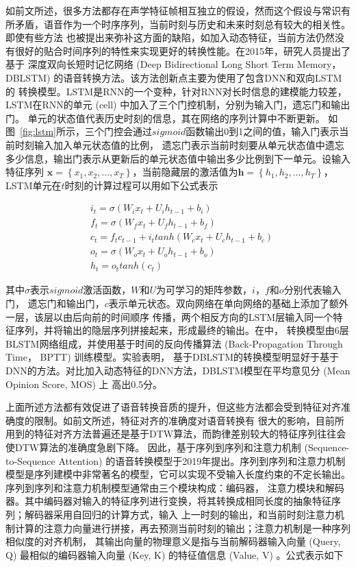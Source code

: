 如前文所述，很多方法都存在声学特征帧相互独立的假设，然而这个假设与常识有所矛盾，语音作为一个时序序列，当前时刻与历史和未来时刻总有较大的相关性。即使有些方法
也被提出来弥补这方面的缺陷，如加入动态特征，当前方法仍然没有很好的贴合时间序列的特性来实现更好的转换性能。在2015年，研究人员提出了基于
深度双向长短时记忆网络 (Deep Bidirectional Long Short Term Memory， DBLSTM) 的语音转换方法\cite{sun2015voice}。该方法创新点主要为使用了包含DNN和双向LSTM的
转换模型。LSTM是RNN的一个变种，针对RNN对长时信息的建模能力较差，LSTM在RNN的单元 (cell) 中加入了三个门控机制，分别为输入门，遗忘门和输出门。
单元的状态值代表历史时刻的信息，其在网络的序列计算中不断更新。
如图~\ref{fig:lstm}所示，三个门控会通过$sigmoid$函数输出0到1之间的值，输入门表示当前时刻输入加入单元状态值的比例，
遗忘门表示当前时刻要从单元状态值中遗忘多少信息，输出门表示从更新后的单元状态值中输出多少比例到下一单元。设输入特征序列
$\mathbf{x}=\left\{x_1,x_2,...,x_T\right\}$，当前隐藏层的激活值为$\mathbf{h}=\left\{h_1,h_2,...,h_T\right\}$，
LSTM单元在$t$时刻的计算过程可以用如下公式表示

\begin{align}
    & i_t = \sigma (W_{i}x_t + U_ih_{t-1}+b_i) \\
    & f_t = \sigma (W_{f}x_t + U_fh_{t-1}+b_f) \\
    & c_t = f_tc_{t-1} + i_ttanh(W_cx_t+U_ch_{t-1}+b_c) \\
    & o_t = \sigma (W_{o}x_t + U_oh_{t-1}+b_o) \\
    & h_t = o_ttanh(c_t)
\end{align}
  
其中$\sigma$表示$sigmoid$激活函数，$W$和$U$为可学习的矩阵参数，$i$，$f$和$o$分别代表输入门，
遗忘门和输出门，$c$表示单元状态。双向网络在单向网络的基础上添加了额外一层，该层以由后向前的时间顺序
传播，两个相反方向的LSTM层输入同一个特征序列，并将输出的隐层序列拼接起来，形成最终的输出。在\cite{sun2015voice}中，
转换模型由6层BLSTM网络组成，并使用基于时间的反向传播算法 (Back-Propagation Through Time， BPTT) 训练模型。实验表明，
基于DBLSTM的转换模型明显好于基于DNN的方法。对比加入动态特征的DNN方法，DBLSTM模型在平均意见分 (Mean Opinion Score, MOS) 上
高出0.5分。

上面所述方法都有效促进了语音转换音质的提升，但这些方法都会受到特征对齐准确度的限制。如前文所述，特征对齐的准确度对语音转换有
很大的影响，目前所用到的特征对齐方法普遍还是基于DTW算法，而韵律差别较大的特征序列往往会使DTW算法的准确度急剧下降。
因此，基于序列到序列和注意力机制 (Sequence-to-Sequence Attention) 的语音转换模型于2019年提出\cite{tanaka2019atts2s}。序列到序列和注意力机制
模型是序列建模中非常著名的模型，它可以实现不受输入长度约束的不定长输出。序列到序列和注意力机制模型通常由三个模块构成：编码器，
注意力模块和解码器。其中编码器对输入的特征序列进行变换，将其转换成相同长度的抽象特征序列；解码器采用自回归的计算方式，输入
上一时刻的输出，和当前时刻注意力机制计算的注意力向量进行拼接，再去预测当前时刻的输出；注意力机制是一种序列相似度的对齐机制，
其输出向量的物理意义是指与当前解码器输入向量 (Query, Q) 最相似的编码器输入向量 (Key, K) 的特征值信息 (Value, V) 。公式表示如下


